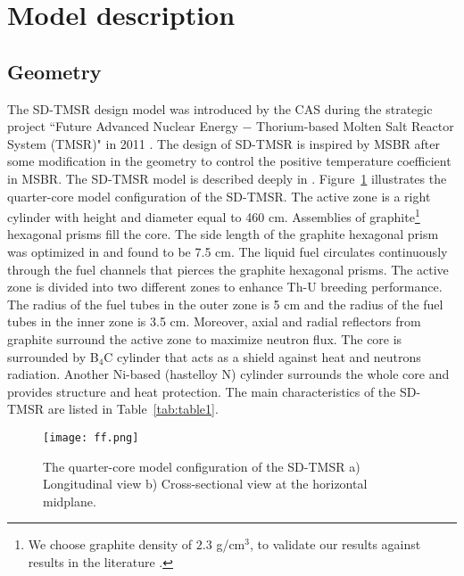 \section{Model description}
\subsection{Geometry}
The \gls{SD-TMSR} design model was introduced by the \gls{CAS} during the strategic project ``Future Advanced Nuclear Energy $-$ Thorium-based Molten Salt Reactor System (TMSR)" in 2011 \cite{li_optimization_2018,jiang2012advanced,li2015analysis,li2017model}. The design of \gls{SD-TMSR} is inspired by \gls{MSBR} \cite{robertson_conceptual_1971} after some modification in the geometry to control the positive temperature coefficient in MSBR. The \gls{SD-TMSR} model is described deeply in \cite{li_optimization_2018}.
Figure~\ref{fig:ff} illustrates the quarter-core model configuration of the \gls{SD-TMSR}. The active zone is a right cylinder with height and diameter equal to 460 cm. Assemblies of graphite\footnote{We choose graphite density of $2.3$ g/cm$^3$, to validate our results against results in the literature \cite{li_optimization_2018,nuttin2005potential}.} hexagonal prisms fill the core. The side length of the graphite hexagonal prism was optimized in \cite{li_optimization_2018} and found to be 7.5 cm. The liquid fuel circulates continuously through the fuel channels that pierces the graphite hexagonal prisms. The active zone is divided into two different zones to enhance Th-U breeding performance. The radius of the fuel tubes in the outer zone is 5 cm and the radius of the fuel tubes in the inner zone is 3.5 cm. Moreover, axial and radial reflectors from graphite surround the active zone to maximize neutron flux. The core is surrounded by B${_4}$C cylinder that acts as a shield against heat and neutrons radiation. 
Another Ni-based (hastelloy N) cylinder surrounds the whole core and provides structure and heat protection. The main characteristics of the \gls{SD-TMSR} are listed in Table~\ref{tab:table1}.

\begin{figure} %
	\texttt{[image: ff.png]}
	\caption{The quarter-core model configuration of the SD-TMSR a) Longitudinal view b) Cross-sectional view at the horizontal midplane.}
	\label{fig:ff}
\end{figure}

